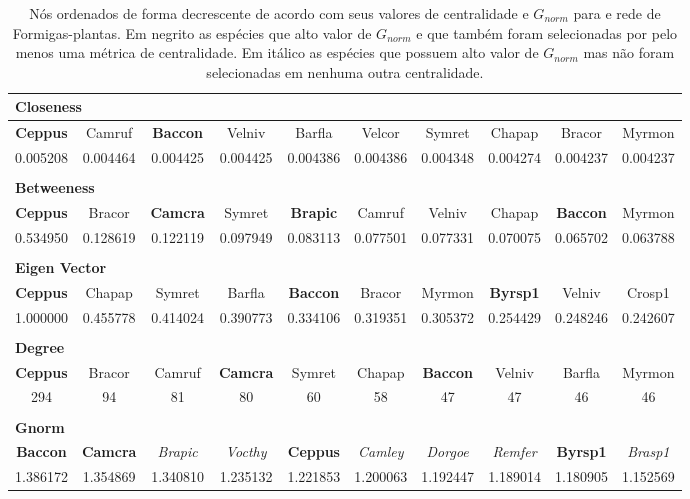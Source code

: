\documentclass[
  12pt,
]{article}
\begin{document}
\begin{table}[!ht]
\caption{Nós ordenados de forma decrescente de acordo com seus valores de centralidade e $G_{norm}$ para e rede de Formigas-plantas. Em negrito as espécies que alto valor de $G_{norm}$ e que também foram selecionadas por pelo menos uma métrica de centralidade. Em itálico as espécies que possuem alto valor de $G_{norm}$ mas não foram selecionadas em nenhuma outra centralidade.}\label{table:centr_raw_ants}
\footnotesize
\begin{tabular}{cccccccccc}
\multicolumn{10}{l}{ \textbf{Closeness} } \\
\hline
\textbf{Ceppus} & Camruf & \textbf{Baccon} & Velniv & Barfla & Velcor & Symret & Chapap & Bracor & Myrmon \\
\hline
\hline
0.005208 & 0.004464 & 0.004425 & 0.004425 & 0.004386 & 0.004386 & 0.004348 & 0.004274 & 0.004237 & 0.004237\\
\hline
& & & & & & & & & \\
\multicolumn{10}{l}{ \textbf{Betweeness} } \\
\hline
\textbf{Ceppus} & Bracor & \textbf{Camcra} & Symret & \textbf{Brapic} & Camruf & Velniv & Chapap & \textbf{Baccon} & Myrmon \\
\hline
\hline
0.534950 & 0.128619 & 0.122119 & 0.097949 & 0.083113 & 0.077501 & 0.077331 & 0.070075 & 0.065702 & 0.063788\\
\hline
& & & & & & & & & \\
\multicolumn{10}{l}{ \textbf{Eigen Vector} } \\
\hline
\textbf{Ceppus} & Chapap & Symret & Barfla & \textbf{Baccon} & Bracor & Myrmon & \textbf{Byrsp1} & Velniv & Crosp1\\
\hline
\hline
1.000000 & 0.455778 & 0.414024 & 0.390773 & 0.334106 & 0.319351 & 0.305372 & 0.254429 & 0.248246 & 0.242607\\
\hline
& & & & & & & & & \\
\multicolumn{10}{l}{ \textbf{Degree} } \\
\hline
\textbf{Ceppus} & Bracor & Camruf & \textbf{Camcra} & Symret & Chapap & \textbf{Baccon} & Velniv & Barfla & Myrmon\\
\hline
\hline
294 & 94 & 81 & 80 & 60 & 58 & 47 & 47 & 46 & 46\\
\hline
& & & & & & & & & \\
\multicolumn{10}{l}{ \textbf{Gnorm} } \\
\hline
\textbf{Baccon} & \textbf{Camcra} & \textit{Brapic} & \textit{Vocthy} & \textbf{Ceppus} & \textit{Camley} & \textit{Dorgoe} & \textit{Remfer} & \textbf{Byrsp1} & \textit{Brasp1} \\
\hline
\hline
1.386172 & 1.354869 & 1.340810 & 1.235132 & 1.221853 & 1.200063 & 1.192447 & 1.189014 & 1.180905 & 1.152569\\
\hline
\end{tabular}
\end{table}
\end{document}
